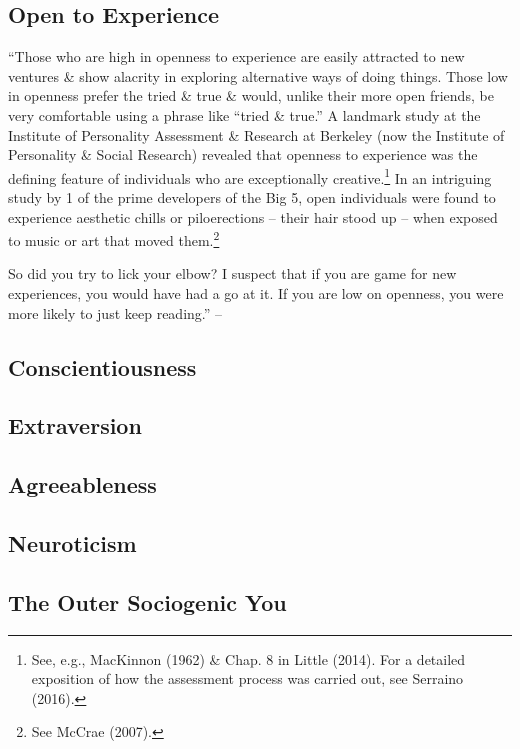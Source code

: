 \documentclass{article}
\numberwithin{equation}{section}
\begin{document}
\subsection{Open to Experience}
``Those who are high in openness to experience are easily attracted to new ventures \& show alacrity in exploring alternative ways of doing things. Those low in openness prefer the tried \& true \& would, unlike their more open friends, be very comfortable using a phrase like ``tried \& true.'' A landmark study at the Institute of Personality Assessment \& Research at Berkeley (now the Institute of Personality \& Social Research) revealed that openness to experience was the defining feature of individuals who are exceptionally creative.\footnote{See, e.g., MacKinnon (1962) \& Chap. 8 in Little (2014). For a detailed exposition of how the assessment process was carried out, see Serraino (2016).} In an intriguing study by 1 of the prime developers of the Big 5, open individuals were found to experience aesthetic chills or piloerections -- their hair stood up -- when exposed to music or art that moved them.\footnote{See McCrae (2007).}

So did you try to lick your elbow? I suspect that if you are game for new experiences, you would have had a go at it. If you are low on openness, you were more likely to just keep reading.'' -- \cite[pp. 16--17]{Little2017}

\subsection{Conscientiousness}

\subsection{Extraversion}

\subsection{Agreeableness}

\subsection{Neuroticism}

\subsection{The Outer Sociogenic You}

\end{document}

